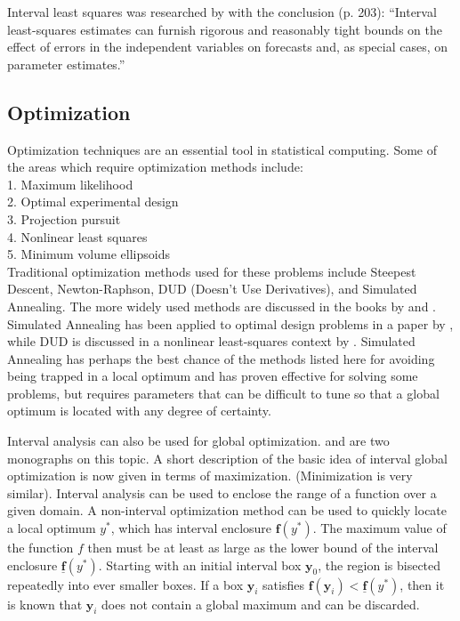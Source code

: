Interval least squares was researched by \cite{Gay88} with the conclusion (p. 203): 
``Interval least-squares estimates can furnish rigorous and reasonably tight 
bounds on the effect of errors in the independent variables on forecasts and, 
as special cases, on parameter estimates.''

\subsection{Optimization }

Optimization techniques are an essential tool in statistical computing. Some of the 
areas which require optimization methods include: \\
1. Maximum likelihood \\
2. Optimal experimental design \\
3. Projection pursuit \\
4. Nonlinear least squares \\
5. Minimum volume ellipsoids \\

Traditional optimization methods used for these problems include Steepest Descent, 
Newton-Raphson, DUD (Doesn't Use Derivatives), and Simulated Annealing. The more 
widely used methods are discussed in the books by \cite{Thisted} and 
\cite{KennedyGentle}. Simulated Annealing has been applied to optimal design
problems in a  
paper by \cite{BJS86}, while DUD is discussed in a nonlinear least-squares 
context by \cite{Ralston}. Simulated Annealing has perhaps the best 
chance of the methods listed here for avoiding being trapped in a local optimum and has 
proven effective for solving some problems, but requires parameters that can
be difficult  
to tune so that a global optimum is located with any degree of certainty. 

Interval analysis can also be used for global optimization. \cite{Han88} 
and \cite{Kea96b} are two monographs on this topic. A short description of
the basic idea of interval global optimization is now given in terms of
maximization. (Minimization is very similar). Interval analysis can be used to
enclose the range of a function over a given domain. A non-interval
optimization method can be used to quickly locate a local optimum $y^*$, which
has interval enclosure $\mathbf{f}(y^*)$. The maximum value of the function
$f$ then must be at least as large as the lower bound of the interval enclosure 
$\underline{\mathbf{f}}(y^*)$. Starting 
with an initial interval box $\mathbf{y}_0$, 
the region is bisected repeatedly into ever smaller boxes. 
If a box $\mathbf{y}_i$ satisfies 
$\mathbf{f}(\mathbf{y}_i) < \underline{\mathbf{f}}(y^*)$,
then it is known that $\mathbf{y}_i$ does not contain a global 
maximum and can be discarded. 

